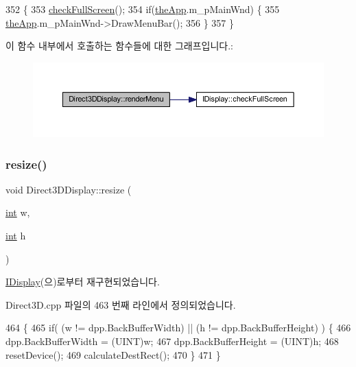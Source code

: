 \begin{DoxyCode}
352 \{
353     \mbox{\hyperlink{class_i_display_afcb9df4a4949d13491f9a07a2ce24eb0}{checkFullScreen}}();
354     \textcolor{keywordflow}{if}(\mbox{\hyperlink{_v_b_a_8cpp_a8095a9d06b37a7efe3723f3218ad8fb3}{theApp}}.m\_pMainWnd) \{
355         \mbox{\hyperlink{_v_b_a_8cpp_a8095a9d06b37a7efe3723f3218ad8fb3}{theApp}}.m\_pMainWnd->DrawMenuBar();
356     \}
357 \}
\end{DoxyCode}
이 함수 내부에서 호출하는 함수들에 대한 그래프입니다.\+:
\nopagebreak
\begin{figure}[H]
\begin{center}
\leavevmode
\includegraphics[width=350pt]{class_direct3_d_display_a099bbef2eaaf90efb3ecb00c68103fe7_cgraph}
\end{center}
\end{figure}
\mbox{\label{class_direct3_d_display_a0e6e22fc78ec40c164ec7943581bcf7f}} 
\subsubsection{\texorpdfstring{resize()}{resize()}}
{\footnotesize\ttfamily void Direct3\+D\+Display\+::resize (\begin{DoxyParamCaption}\item[{\mbox{\hyperlink{_util_8cpp_a0ef32aa8672df19503a49fab2d0c8071}{int}}}]{w,  }\item[{\mbox{\hyperlink{_util_8cpp_a0ef32aa8672df19503a49fab2d0c8071}{int}}}]{h }\end{DoxyParamCaption})\hspace{0.3cm}{\ttfamily [virtual]}}



\mbox{\hyperlink{class_i_display_ad0b4ba99f59edd7a6857e3b3941b3ba2}{I\+Display}}(으)로부터 재구현되었습니다.



Direct3\+D.\+cpp 파일의 463 번째 라인에서 정의되었습니다.


\begin{DoxyCode}
464 \{
465     \textcolor{keywordflow}{if}( (w != dpp.BackBufferWidth) || (h != dpp.BackBufferHeight) ) \{
466         dpp.BackBufferWidth = (UINT)w;
467         dpp.BackBufferHeight = (UINT)h;
468         resetDevice();
469         calculateDestRect();
470     \}
471 \}
\end{DoxyCode}
\mbox{\label{class_direct3_d_display_a46be4b83a670d9d29cef2e7131ed46ae}} 

